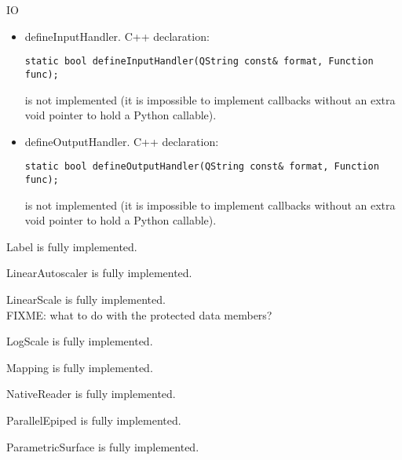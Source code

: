 \documentclass{manual}
\begin{document}
\begin{classdesc*}{IO}
  \begin{itemize}
  \item{defineInputHandler}. C++ declaration:
\begin{verbatim}
static bool defineInputHandler(QString const& format, Function func);
\end{verbatim}
    is not implemented (it is impossible to implement callbacks without an
    extra void pointer to hold a Python callable).
  \item{defineOutputHandler}. C++ declaration:
\begin{verbatim}
static bool defineOutputHandler(QString const& format, Function func);
\end{verbatim}
    is not implemented (it is impossible to implement callbacks without an
    extra void pointer to hold a Python callable).
  \end{itemize}
\end{classdesc*}

\begin{classdesc*}{Label}
  is fully implemented.
\end{classdesc*}

\begin{classdesc*}{LinearAutoscaler}
  is fully implemented.
\end{classdesc*}

\begin{classdesc*}{LinearScale}
  is fully implemented.\\
  FIXME: what to do with the protected data members?
\end{classdesc*}

\begin{classdesc*}{LogScale}
  is fully implemented.
\end{classdesc*}

\begin{classdesc*}{Mapping}
  is fully implemented.
\end{classdesc*}

\begin{classdesc*}{NativeReader}
  is fully implemented.
\end{classdesc*}

\begin{classdesc*}{ParallelEpiped}
  is fully implemented.
\end{classdesc*}

\begin{classdesc*}{ParametricSurface}
  is fully implemented.
\end{classdesc*}
\end{document}

